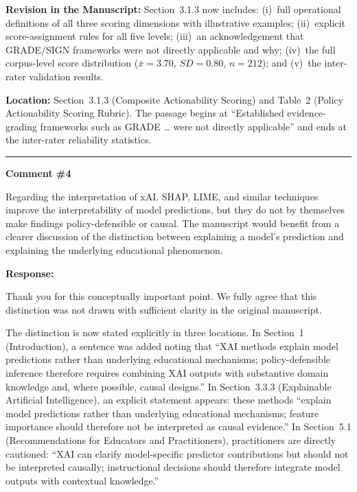 \documentclass[12pt, a4paper]{article}
\begin{document}
\medskip
\noindent\textbf{Revision in the Manuscript:}
Section~3.1.3 now includes: (i)~full operational definitions of all three scoring dimensions with
illustrative examples; (ii)~explicit score-assignment rules for all five levels; (iii)~an
acknowledgement that GRADE/SIGN frameworks were not directly applicable and why; (iv)~the full
corpus-level score distribution ($\bar{x}=3.70$, $SD=0.80$, $n=212$); and (v)~the inter-rater
validation results.

\medskip
\noindent\textbf{Location:} Section~3.1.3 (Composite Actionability Scoring) and Table~2 (Policy
Actionability Scoring Rubric). The passage begins at ``Established evidence-grading frameworks
such as GRADE \ldots{} were not directly applicable'' and ends at the inter-rater reliability
statistics.

\bigskip\hrule\bigskip

\noindent\textbf{Comment \#4}

\medskip
\noindent\textcolor{reviewerblue}{%
Regarding the interpretation of xAI. SHAP, LIME, and similar techniques improve the
interpretability of model predictions, but they do not by themselves make findings policy-defensible
or causal. The manuscript would benefit from a clearer discussion of the distinction between
explaining a model's prediction and explaining the underlying educational phenomenon.}

\medskip
\noindent\textbf{Response:}

Thank you for this conceptually important point. We fully agree that this distinction was not drawn
with sufficient clarity in the original manuscript.

The distinction is now stated explicitly in three locations. In Section~1 (Introduction), a sentence
was added noting that ``XAI methods explain model predictions rather than underlying educational
mechanisms; policy-defensible inference therefore requires combining XAI outputs with substantive
domain knowledge and, where possible, causal designs.'' In Section~3.3.3 (Explainable Artificial
Intelligence), an explicit statement appears: these methods ``explain model predictions rather than
underlying educational mechanisms; feature importance should therefore not be interpreted as causal
evidence.'' In Section~5.1 (Recommendations for Educators and Practitioners), practitioners are
directly cautioned: ``XAI can clarify model-specific predictor contributions but should not be
interpreted causally; instructional decisions should therefore integrate model outputs with
contextual knowledge.''
\end{document}
